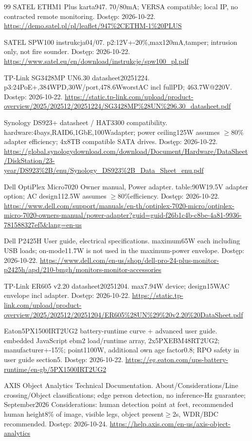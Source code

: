 \begin{thebibliography}{99}
 SATEL ETHM1 Plus karta947. 70/80mA; VERSA compatible; local IP, no contracted remote monitoring. Dostęp: 2026-10-22.
\url{https://demo.satel.pl/pl/leaflet/947\%2CETHM-1\%20PLUS}

 SATEL SPW100 instrukcja04/07. p2:12V+-20\%,max120mA,tamper; intrusion only, not fire sounder. Dostęp: 2026-10-22.
\url{https://www.satel.eu/en/download/instrukcje/spw100_pl.pdf}

 TP-Link SG3428MP UN6.30 datasheet20251224. p3:24PoE+,384WPD,30W/port,478.6WworstAC incl fullPD; 463.7W@220V. Dostęp: 2026-10-22.
\url{https://static.tp-link.com/upload/product-overview/2025/202512/20251224/SG3428MP\%28UN\%296.30_datasheet.pdf}

 Synology DS923+ datasheet / HAT3300 compatibility. hardware:4bays,RAID6,1GbE,100Wadapter; power ceiling125W assumes $\geq$80\% adapter efficiency; 4x8TB compatible SATA drives. Dostęp: 2026-10-22.
\url{https://global.synologydownload.com/download/Document/Hardware/DataSheet/DiskStation/23-year/DS923\%2B/enu/Synology_DS923\%2B_Data_Sheet_enu.pdf}

 Dell OptiPlex Micro7020 Owner manual, Power adapter. table:90W19.5V adapter option; AC design112.5W assumes $\geq$80\%efficiency. Dostęp: 2026-10-22.
\url{https://www.dell.com/support/manuals/en-th/optiplex-7020-micro/optiplex-micro-7020-owners-manual/power-adapter?guid=guid-f26b1c4b-c8be-4a81-9936-781588327ef5&lang=en-us}

 Dell P2425H User guide, electrical specifications. maximum65W each including USB loads; on-mode11.7W is not used in the maximum-power envelope. Dostęp: 2026-10-22.
\url{https://www.dell.com/en-us/shop/dell-pro-24-plus-monitor-p2425h/apd/210-bmgh/monitors-monitor-accessories}

 TP-Link ER605 v2.20 datasheet20251204. max7.94W device; design15WAC envelope incl adapter. Dostęp: 2026-10-22.
\url{https://static.tp-link.com/upload/product-overview/2025/202512/20251204/ER605\%28UN\%29\%20v2.20\%20DataSheet.pdf}

 Eaton5PX1500IRT2UG2 battery-runtime curve + advanced user guide. embedded JavaScript ebm2 load/runtime array, 2x5PXEBM48RT2UG2; manufacturer+-15\%; point1100W, additional own age factor0.8; RPO safety in user guide section5. Dostęp: 2026-10-22.
\url{https://eg.eaton.com/ups-battery-runtime/en-gb/5PX1500IRT2UG2}

 AXIS Object Analytics Technical Documentation. About/Considerations/Line crossing/Object classifications; edge person detection, no inference-Hz guarantee; September2026 Considerations: human detection point at feet, recommended human height8\% of image, visible legs, object present$\geq$2s, WDR/BDC recommended. Dostęp: 2026-10-24.
\url{https://help.axis.com/en-us/axis-object-analytics}


\end{thebibliography}
